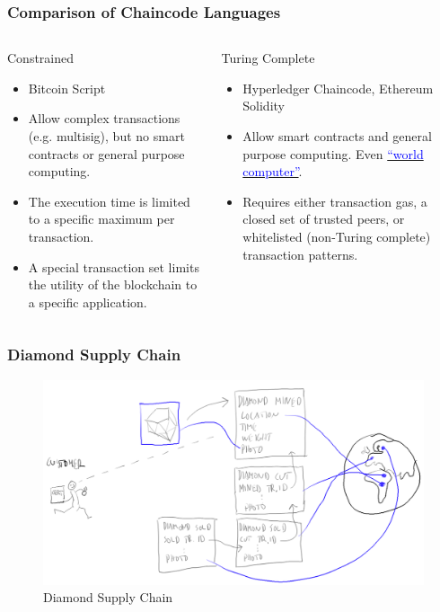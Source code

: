 \documentclass[8pt]{beamer}
\begin{document}
\begin{frame}
\frametitle{Comparison of Chaincode Languages}

\begin{columns}
\begin{column}{0.5\textwidth}
Constrained
\begin{itemize}
 \item Bitcoin Script
 \item Allow complex transactions (e.g. multisig), but no smart contracts or general purpose computing.
 \item The execution time is limited to a specific maximum per transaction.
 \item A special transaction set limits the utility of the blockchain to a specific application.
\end{itemize}
\end{column}
\begin{column}{0.5\textwidth}
Turing Complete
\begin{itemize}
 \item Hyperledger Chaincode, Ethereum Solidity
 \item Allow smart contracts and general purpose computing. Even \href{https://en.wikipedia.org/wiki/Synereo}{\textcolor{blue}{``world computer''}}.
 \item Requires either transaction gas, a closed set of trusted peers, or whitelisted (non-Turing complete) transaction patterns.
\end{itemize}
\end{column}
\end{columns}

\end{frame}

\begin{frame}
\frametitle{Diamond Supply Chain}

\begin{figure}[tb]
 \centering
 \includegraphics[width=11 cm,keepaspectratio=true]{./blockchain_images/diamond.png}
 \caption{Diamond Supply Chain}
\end{figure}
\end{frame}
\end{document}
